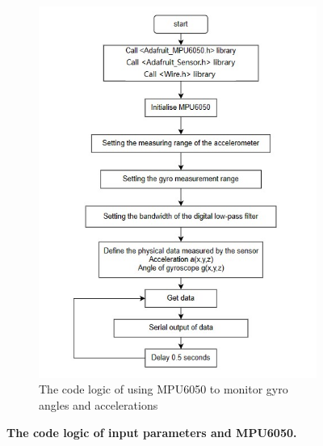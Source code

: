 \begin{figure}[H]
\begin{subfigure}{0.45\textwidth}
        \includegraphics[width=\linewidth]{Image/Design/code_logic_angle.jpg}
        \caption{\centering The code logic of using MPU6050 to monitor gyro angles and accelerations}
        \label{fig:cl_angle}
    \end{subfigure}
    \caption[The code logic of input parameters and MPU6050]
    {\centering \textbf{The code logic of input parameters and MPU6050.}}
    \label{fig:cl_input_angle}
\end{figure}
